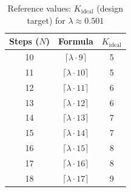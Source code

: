 \begin{table}[t]
\centering
\caption{Reference values: $K_{\text{ideal}}$ (design target) for $\lambda \approx 0.501$}
\label{tab:contrast-efficiency-ideal}
\begin{tabular}{c c c}
\hline
Steps ($N$) & Formula & $K_{\text{ideal}}$ \\
\hline
10 & $\lceil \lambda \cdot 9 \rceil$  & 5 \\
11 & $\lceil \lambda \cdot 10 \rceil$ & 5 \\
12 & $\lceil \lambda \cdot 11 \rceil$ & 6 \\
13 & $\lceil \lambda \cdot 12 \rceil$ & 6 \\
14 & $\lceil \lambda \cdot 13 \rceil$ & 7 \\
15 & $\lceil \lambda \cdot 14 \rceil$ & 7 \\
16 & $\lceil \lambda \cdot 15 \rceil$ & 8 \\
17 & $\lceil \lambda \cdot 16 \rceil$ & 8 \\
18 & $\lceil \lambda \cdot 17 \rceil$ & 9 \\
\hline
\end{tabular}
\end{table}